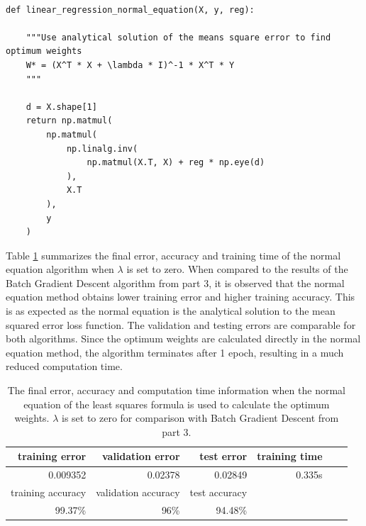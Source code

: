 \documentclass[12pt]{article}
\newenvironment{problem}[2][Problem]{\begin{trivlist}
\item[\hskip \labelsep {\bfseries #1}\hskip \labelsep {\bfseries #2.}]}{\end{trivlist}}
\begin{document}
\begin{problem}{1}
\begin{lstlisting}[frame=single]

def linear_regression_normal_equation(X, y, reg):

    """Use analytical solution of the means square error to find optimum weights
    W* = (X^T * X + \lambda * I)^-1 * X^T * Y
    """

    d = X.shape[1]
    return np.matmul(
        np.matmul(
            np.linalg.inv(
                np.matmul(X.T, X) + reg * np.eye(d)
            ),
            X.T
        ),
        y
    )
\end{lstlisting}

\bigskip

Table \ref{table:1-5} summarizes the final error, accuracy and training time of the normal equation algorithm when $\lambda$ is set to zero. When compared to the results of the Batch Gradient Descent algorithm from part 3, it is observed that the normal equation method obtains lower training error and higher training accuracy. This is as expected as the normal equation is the analytical solution to the mean squared error loss function. The validation and testing errors are comparable for both algorithms. Since the optimum weights are calculated directly in the normal equation method, the algorithm terminates after 1 epoch, resulting in a much reduced computation time.    

\begin{table}[!htb]
\center
\begin{tabular}{rrrrrr}
training error  & validation error  & test error & training time \\ \hline
0.009352 &0.02378    &
0.02849 &0.335s \\
\hline
training accuracy &validation accuracy & test accuracy\\ 
\hline
99.37\% &96\% &94.48\% \\
\hline\end{tabular}
\caption{The final error, accuracy and computation time information when the normal equation of the least squares formula is used to calculate the optimum weights. $\lambda$ is set to zero for comparison with Batch Gradient Descent from part 3. }
\label{table:1-5}
\end{table}


\end{problem}

\bigskip
\end{document}
